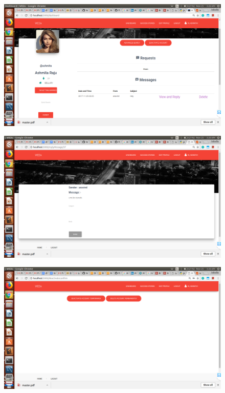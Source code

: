 \documentclass[12pt]{report}
\begin{document}
\begin{figure}[!htb]
    \centering
    \includegraphics[width=1\textwidth]{sc-17.png}
\end{figure}

\begin{figure}[!htb]
    \centering
    \includegraphics[width=1\textwidth]{sc-18.png}
\end{figure}

\begin{figure}[!htb]
    \centering
    \includegraphics[width=1\textwidth]{sc-19.png}
\end{figure}
\end{document}
